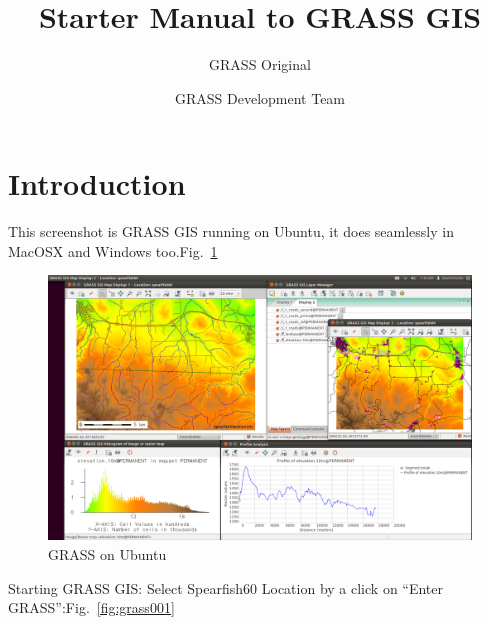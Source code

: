 %

\graphicspath{{./images/}}

\title{Starter Manual to GRASS GIS}
\subtitle{GRASS Original}
\author{GRASS Development Team}

\maketitle

\section{Introduction}

This screenshot is GRASS GIS running on Ubuntu, it does seamlessly in MacOSX and Windows too.Fig.~\ref{fig:grass000}
\begin{figure}[htbp]
   \centering
   \includegraphics[scale=0.125]{grass000.png}
   \caption{GRASS on Ubuntu}
   \label{fig:grass000}
\end{figure}

Starting GRASS GIS: Select Spearfish60 Location by a click on
``Enter GRASS'':Fig.~\ref{fig:grass001}

